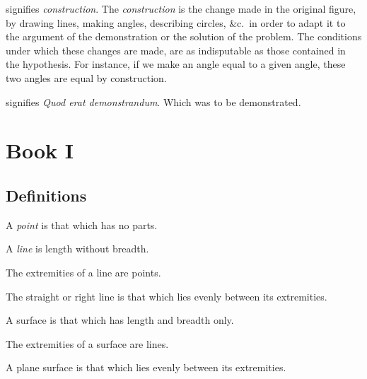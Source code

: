 \documentclass{byrne-book}
\begin{document}
\symb{\conststr}
 signifies \emph{construction}. The \emph{construction} is the change made in the original figure, by drawing lines, making angles, describing circles, \&c.\ in order to adapt it to the argument of the demonstration or the solution of the problem. The conditions under which these changes are made, are as indisputable as those contained in the hypothesis. For instance, if we make an angle equal to a given angle, these two angles are equal by construction.

\symb{\qedstr}
signifies \emph{Quod erat demonstrandum}. Which was to be demonstrated.


\part{Book I}


\chapter*{Definitions}

\startdefinition{}\label{def:I.I}
\begin{center}
A \emph{point} is that which has no parts.
\end{center}


\startdefinition{}\label{def:I.II}
\begin{center}
A \emph{line} is length without breadth.
\end{center}


\startdefinition{}\label{def:I.III}
\begin{center}
The extremities of a line are points.
\end{center}


\startdefinition{}\label{def:I.IV}
\begin{center}
The straight or right line is that which lies evenly between its extremities.
\end{center}


\startdefinition{}\label{def:I.V}
\begin{center}
A surface is that which has length and breadth only.
\end{center}


\startdefinition{}\label{def:I.VI}
\begin{center}
The extremities of a surface are lines.
\end{center}


\startdefinition{}\label{def:I.VII}
\begin{center}
A plane surface is that which lies evenly between its extremities.
\end{center}
\end{document}
